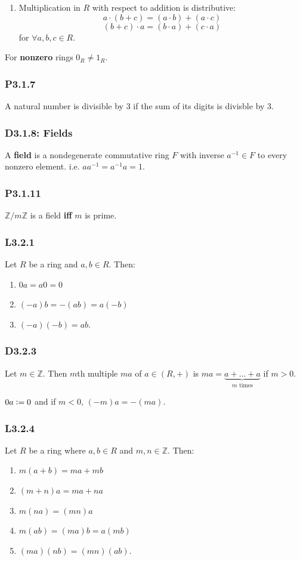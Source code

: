 \documentclass{article}
\newcommand{\deq}{\vcentcolon=}
\begin{document}
\begin{multicols*}{3}
\begin{enumerate}
    \item Multiplication in $R$ with respect to addition
    is distributive:
    $$a\cdot(b+c)=(a\cdot b)+(a\cdot c)$$
    $$(b+c)\cdot a=(b\cdot a)+(c\cdot a)$$
    for $\forall a,b,c\in R$.
\end{enumerate}
For \textbf{nonzero} rings $0_R\neq1_R$.

\subsubsection*{P3.1.7}
A natural number is divisible by $3$ if
the sum of its digits is divisble by $3$.

\subsubsection*{D3.1.8: Fields}
A \textbf{field} is a nondegenerate commutative ring $F$
with inverse $a^{-1}\in F$ to every nonzero element.
i.e. $aa^{-1}=a^{-1}a=1$.

\subsubsection*{P3.1.11}
$\mathbb{Z}/m\mathbb{Z}$
is a field \textbf{if{}f} $m$ is prime.

\subsubsection*{L3.2.1}
Let $R$ be a ring and $a,b\in R$. Then:
\begin{enumerate}
    \item $0a=a0=0$
    \item $(-a)b=-(ab)=a(-b)$
    \item $(-a)(-b)=ab$.
\end{enumerate}

\subsubsection*{D3.2.3}
Let $m\in\mathbb{Z}$. Then $m$th multiple $ma$ of
$a\in(R,+)$ is $ma=\underbrace{a+\dots+a}_
\text{$m$ times}$ if $m>0$.

$0a\deq0$ and if $m<0$, $(-m)a=-(ma)$.

\subsubsection*{L3.2.4}
Let $R$ be a ring where $a,b\in R$ and
$m,n\in\mathbb{Z}$. Then:
\begin{enumerate}
    \item $m(a+b)=ma+mb$
    \item $(m+n)a=ma+na$
    \item $m(na)=(mn)a$
    \item $m(ab)=(ma)b=a(mb)$
    \item $(ma)(nb)=(mn)(ab).$
\end{enumerate}


\end{multicols*}
\end{document}
